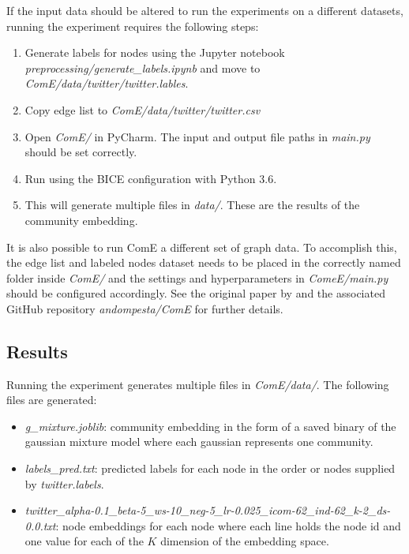 \documentclass[sigconf]{acmart}
\begin{document}
If the input data should be altered to run the experiments on a different datasets, running the experiment requires the following steps:

\begin{enumerate}
	\item Generate labels for nodes using the Jupyter notebook \textit{preprocessing/generate\_labels.ipynb} and move to \textit{ComE/data/twitter/twitter.lables}.
	\item Copy edge list to \textit{ComE/data/twitter/twitter.csv}
	\item Open \textit{ComE/} in PyCharm. The input and output file paths in \textit{main.py} should be set correctly.
	\item Run using the BICE configuration with Python 3.6.
	\item This will generate multiple files in \textit{data/}. These are the results of the community embedding.
\end{enumerate}

It is also possible to run ComE a different set of graph data. To accomplish this, the edge list and labeled nodes dataset needs to be placed in the correctly named folder inside \textit{ComE/} and the settings and hyperparameters in \textit{ComeE/main.py} should be configured accordingly. See the original paper by \citeauthor{Cav17}\cite{Cav17} and the associated GitHub repository \textit{andompesta/ComE}\cite{ComE} for further details.

\subsection{Results}

Running the experiment generates multiple files in \textit{ComE/data/}. The following files are generated:
\begin{itemize}
	\item \textit{g\_mixture.joblib}: community embedding in the form of a saved binary of the gaussian mixture model where each gaussian represents one community.
	\item \textit{labels\_pred.txt}: predicted labels for each node in the order or nodes supplied by \textit{twitter.labels}.
	\item \textit{twitter\_alpha-0.1\_beta-5\_ws-10\_neg-5\_lr-0.025\_icom-62\_ind-62\_k-2\_ds-0.0.txt}: node embeddings for each node where each line holds the node id and one value for each of the $K$ dimension of the embedding space.
\end{itemize}
\end{document}
